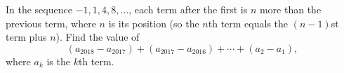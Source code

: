In the sequence $-1,1,4,8,\dots$, each term after the first is $n$ more than the previous term, where $n$ is its position (so the $n$th term equals the $(n-1)$st term plus $n$). Find the value of
\[
(a_{2018}-a_{2017})+(a_{2017}-a_{2016})+\cdots+(a_2-a_1),
\]
where $a_k$ is the $k$th term.
